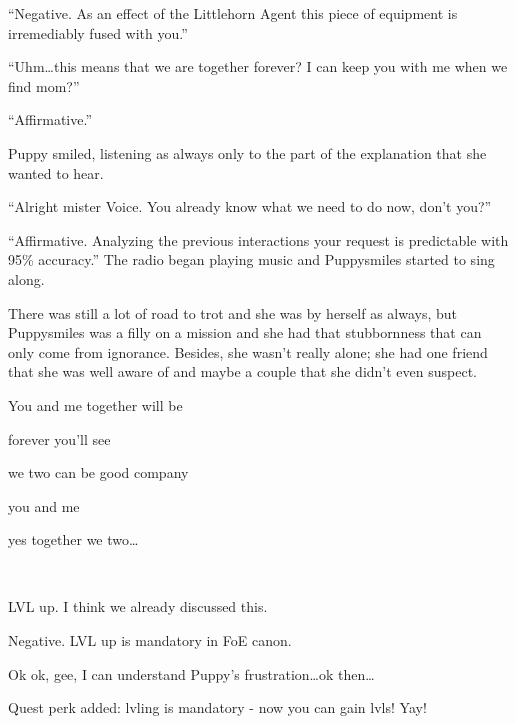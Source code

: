 ``{\mt Negative. As an effect of the Littlehorn Agent this piece of equipment is irremediably fused with you.}''

``Uhm\dots this means that we are together forever? I can keep you with me when we find mom?''

``{\mt Affirmative.}''

Puppy smiled, listening as always only to the part of the explanation that she wanted to hear.

``Alright mister Voice. You already know what we need to do now, don't you?''

``{\mt Affirmative. Analyzing the previous interactions your request is predictable with 95\% accuracy.}'' The radio began playing music and Puppysmiles started to sing along.

There was still a lot of road to trot and she was by herself as always, but Puppysmiles was a filly on a mission and she had that stubbornness that can only come from ignorance. Besides, she wasn't really alone; she had one friend that she was well aware of and maybe a couple that she didn't even suspect.


\begin{song}
    You and me together will be
    
    forever you'll see
    
    we two can be good company
    
    you and me
    
    yes together we two\dots
\end{song}

\clearpage

~\vfill

\begin{engnote}
LVL up. I think we already discussed this.

Negative. LVL up is mandatory in FoE canon.

Ok ok, gee, I can understand Puppy's frustration\dots ok then\dots

Quest perk added: lvling is mandatory - now you can gain lvls! Yay!
\end{engnote}


